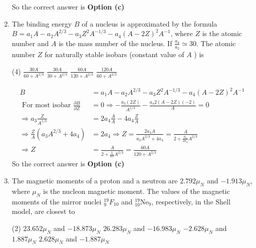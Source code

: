 \begin{enumerate}
\begin{answer}
		So the correct answer is \textbf{Option (c)}
\end{answer}
\item  The binding energy $B$ of a nucleus is approximated by the formula $B=a_{1} A-a_{2} A^{2 / 3}-a_{3} Z^{2} A^{-1 / 3}-a_{4}(A-2 Z)^{2} A^{-1}$, where $Z$ is the atomic number and $A$ is the mass number of the nucleus. If $\frac{a_{4}}{a_{2}} \simeq 30$. The atomic number $Z$ for naturally stable isobars (constant value of $A$ ) is
 \begin{tasks}(4)
	\task[\textbf{a.}]$\frac{30 A}{60+A^{2 / 3}}$
	\task[\textbf{b.}]$\frac{30 A}{30+A^{2 / 3}}$
	\task[\textbf{c.}]$\frac{60 A}{120+A^{2 / 3}}$
	\task[\textbf{d.}]  $\frac{120 A}{60+A^{2 / 3}}$
\end{tasks}
\begin{answer}
	\begin{align*}
	B&=a_{1} A-a_{2} A^{2 / 3}-a_{3} Z^{2} A^{-1 / 3}-a_{4}(A-2 Z)^{2} A^{-1}\\
	\text { For most isobar } \frac{\partial B}{\partial Z}&=0 \Rightarrow-\frac{a_{3}(2 Z)}{A^{1 / 3}}-\frac{a_{4} 2(A-2 Z)(-2)}{A}=0\\
	\Rightarrow a_{3} \frac{Z}{A^{1 / 3}}&=2 a_{4} \frac{A}{A}-4 a_{4} \frac{Z}{A} \\
	\Rightarrow \frac{Z}{A}\left(a_{3} A^{2 / 3}+4 a_{4}\right)&=2 a_{4} \Rightarrow Z=\frac{2 a_{4} A}{a_{3} A^{2 / 3}+4 a_{4}}=\frac{A}{2+\frac{a_{3}}{2 a_{4}} A^{2 / 3}}\\
	\Rightarrow Z&=\frac{A}{2+\frac{1}{60} A^{2 / 3}}=\frac{60 A}{120+A^{2 / 3}}
	\end{align*}
		So the correct answer is \textbf{Option (c)}
\end{answer}
\item  The magnetic moments of a proton and a neutron are $2.792 \mu_{N}$ and $-1.913 \mu_{N}$, where $\mu_{N}$ is the nucleon magnetic moment. The values of the magnetic moments of the mirror nuclei ${ }_{9}^{19} F_{10}$ and ${ }_{10}^{19} \mathrm{Ne}_{9}$, respectively, in the Shell model, are closest to
 \begin{tasks}(2)
	\task[\textbf{a.}]$23.652 \mu_{N}$ and $-18.873 \mu_{N}$
	\task[\textbf{b.}]$26.283 \mu_{N}$ and $-16.983 \mu_{N}$
	\task[\textbf{c.}]$-2.628 \mu_{N}$ and $1.887 \mu_{N}$
	\task[\textbf{d.}]  $2.628 \mu_{N}$ and $-1.887 \mu_{N}$
\end{tasks}
\begin{answer}
	\begin{align*}

\end{align*}
\end{answer}
\end{enumerate}
